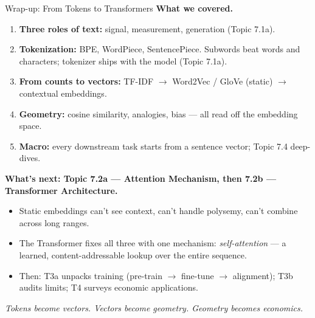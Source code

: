 \begin{frame}{Wrap-up: From Tokens to Transformers}
\textbf{What we covered.}
\begin{enumerate}\setlength{\itemsep}{1pt}
\item \textbf{Three roles of text:} signal, measurement, generation (Topic 7.1a).
\item \textbf{Tokenization:} BPE, WordPiece, SentencePiece. Subwords beat words and characters; tokenizer ships with the model (Topic 7.1a).
\item \textbf{From counts to vectors:} TF-IDF $\to$ Word2Vec / GloVe (static) $\to$ contextual embeddings.
\item \textbf{Geometry:} cosine similarity, analogies, bias --- all read off the embedding space.
\item \textbf{Macro:} every downstream task starts from a sentence vector; Topic 7.4 deep-dives.
\end{enumerate}

\medskip
\textbf{What's next: Topic 7.2a --- Attention Mechanism, then 7.2b --- Transformer Architecture.}
\begin{itemize}\setlength{\itemsep}{1pt}
\item Static embeddings can't see context, can't handle polysemy, can't combine across long ranges.
\item The Transformer fixes all three with one mechanism: \emph{self-attention} --- a learned, content-addressable lookup over the entire sequence.
\item Then: T3a unpacks training (pre-train $\to$ fine-tune $\to$ alignment); T3b audits limits; T4 surveys economic applications.
\end{itemize}

\medskip
\centering\emph{Tokens become vectors. Vectors become geometry. Geometry becomes economics.}
\end{frame}


